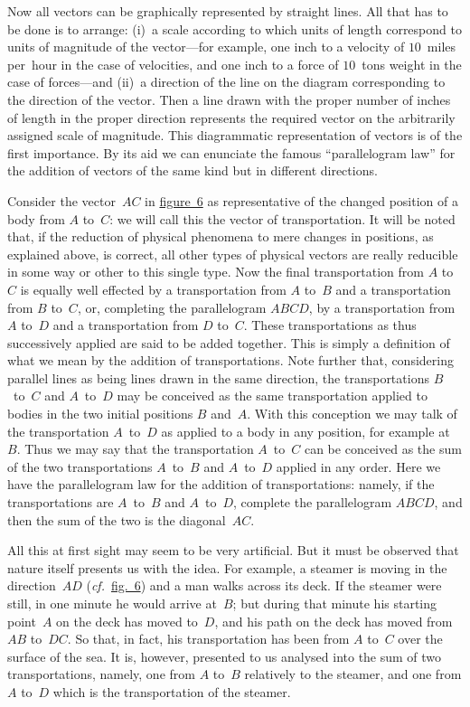 \documentclass[12pt,leqno]{book}[2005/09/16]
\newcommand{\Chg}[2]{#2}
\newcommand{\Fig}[2][Fig.]{\hyperref[fig:#2]{#1~#2}}
\newcommand{\PageSep}[1]{\ignorespaces}
\newcommand{\cf}{\emph{cf.}}
\begin{document}
Now all vectors can be graphically represented
by straight lines. All that has to be
done is to arrange: (i)~a scale according to
which units of length correspond to units of
magnitude of the vector---for example, one
inch to a velocity of $10$~miles per~hour in the
case of velocities, and one inch to a force of
$10$~tons weight in the case of forces---and (ii)~a
direction of the line on the diagram corresponding
to the direction of the vector. Then
a line drawn with the proper number of inches
of length in the proper direction represents the
required vector on the arbitrarily assigned scale
of magnitude. This diagrammatic representation
of vectors is of the first importance. By
its aid we can enunciate the famous ``parallelogram
law'' for the addition of vectors of the
same kind but in different directions.

Consider the vector~$AC$ in \Fig[figure]{6} as representative
\PageSep{54}
%
of the changed position of a body
from $A$ to~$C$: we will call this the vector of
transportation. It will be noted that, if the
reduction of physical phenomena to mere
changes in positions, as explained above, is
correct, all other types of physical vectors are
really reducible in some way or other to this
single type. Now the final transportation
from $A$ to~$C$ is equally well effected by a
transportation from $A$ to~$B$ and a transportation
from $B$ to~$C$, or, completing the parallelogram
$ABCD$, by a transportation from $A$ to~$D$
and a transportation from $D$ to~$C$. These
transportations as thus successively applied
are said to be added together. This is simply
a definition of what we mean by the addition
of transportations. Note further that, considering
parallel lines as being lines drawn in
the same direction, the transportations $B$~to~$C$
and $A$~to~$D$ may be conceived as the same
transportation applied to bodies in the two
initial positions $B$ and~$A$. With this conception
we may talk of the transportation
$A$~to~$D$ as applied to a body in any position,
for example at~$B$. Thus we may say that
the transportation $A$~to~$C$ can be conceived
as the sum of the two transportations $A$~to~$B$
and $A$~to~$D$ applied in any order. Here
we have the parallelogram law for the addition
of transportations: namely, if the
transportations are $A$~to~$B$ and $A$~to~$D$,
\PageSep{55}
complete the parallelogram $ABCD$, and then
the sum of the two is the diagonal~$AC$.

All this at first sight may seem to be
very artificial. But it must be observed
that nature itself presents us with the idea.
For example, a steamer is moving in the
direction~$AD$ (\Chg{cf.}{\cf}\ \Fig[fig.]{6}) and a man walks
across its deck. If the steamer were still,
in one minute he would arrive at~$B$; but
during that minute his starting point~$A$ on
the deck has moved to~$D$, and his path on
the deck has moved from $AB$ to~$DC$. So
that, in fact, his transportation has been from
$A$ to~$C$ over the surface of the sea. It is,
however, presented to us analysed into the
sum of two transportations, namely, one from
$A$ to~$B$ relatively to the steamer, and one
from $A$ to~$D$ which is the transportation of
the steamer.
\end{document}

